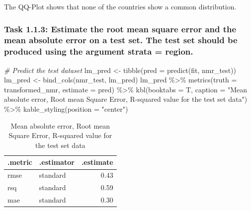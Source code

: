 \documentclass[
]{article}
\newenvironment{Shaded}{\begin{snugshade}}{\end{snugshade}}
\newcommand{\AttributeTok}[1]{\textcolor[rgb]{0.77,0.63,0.00}{#1}}
\newcommand{\CommentTok}[1]{\textcolor[rgb]{0.56,0.35,0.01}{\textit{#1}}}
\newcommand{\FunctionTok}[1]{\textcolor[rgb]{0.00,0.00,0.00}{#1}}
\newcommand{\NormalTok}[1]{#1}
\newcommand{\OtherTok}[1]{\textcolor[rgb]{0.56,0.35,0.01}{#1}}
\newcommand{\SpecialCharTok}[1]{\textcolor[rgb]{0.00,0.00,0.00}{#1}}
\newcommand{\StringTok}[1]{\textcolor[rgb]{0.31,0.60,0.02}{#1}}
\begin{document}
The QQ-Plot shows that none of the countries show a common distribution.

\hypertarget{task-1.1.3-estimate-the-root-mean-square-error-and-the-mean-absolute-error-on-a-test-set.-the-test-set-should-be-produced-using-the-argument-strata-region.}{%
\subsubsection{Task 1.1.3: Estimate the root mean square error and the
mean absolute error on a test set. The test set should be produced using
the argument strata =
region.}\label{task-1.1.3-estimate-the-root-mean-square-error-and-the-mean-absolute-error-on-a-test-set.-the-test-set-should-be-produced-using-the-argument-strata-region.}}

\begin{Shaded}
\begin{Highlighting}[]
\CommentTok{\# Predict the test dataset}
\NormalTok{lm\_pred }\OtherTok{\textless{}{-}} \FunctionTok{tibble}\NormalTok{(}\AttributeTok{pred =} \FunctionTok{predict}\NormalTok{(fit, nmr\_test))}
\NormalTok{lm\_pred }\OtherTok{\textless{}{-}} \FunctionTok{bind\_cols}\NormalTok{(nmr\_test, lm\_pred)}
\NormalTok{lm\_pred }\SpecialCharTok{\%\textgreater{}\%} 
  \FunctionTok{metrics}\NormalTok{(}\AttributeTok{truth =}\NormalTok{ transformed\_nmr,}
          \AttributeTok{estimate =}\NormalTok{ pred) }\SpecialCharTok{\%\textgreater{}\%} 
  \FunctionTok{kbl}\NormalTok{(}\AttributeTok{booktabs =}\NormalTok{ T,}
      \AttributeTok{caption =} \StringTok{"Mean absolute error, Root mean Square Error, R{-}squared value for the test set data"}\NormalTok{) }\SpecialCharTok{\%\textgreater{}\%}
  \FunctionTok{kable\_styling}\NormalTok{(}\AttributeTok{position =} \StringTok{"center"}\NormalTok{)}
\end{Highlighting}
\end{Shaded}

\begin{table}

\caption{\label{tab:unnamed-chunk-10}Mean absolute error, Root mean Square Error, R-squared value for the test set data}
\centering
\begin{tabular}[t]{llr}
\toprule
.metric & .estimator & .estimate\\
\midrule
rmse & standard & 0.43\\
rsq & standard & 0.59\\
mae & standard & 0.30\\
\bottomrule
\end{tabular}
\end{table}
\end{document}
